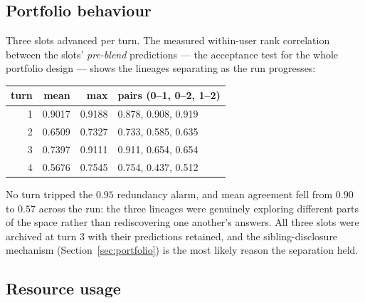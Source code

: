 \documentclass[11pt,a4paper]{article}
\begin{document}
\subsection{Portfolio behaviour}

Three slots advanced per turn. The measured within-user rank correlation between the slots'
\emph{pre-blend} predictions --- the acceptance test for the whole portfolio design --- shows
the lineages separating as the run progresses:

\begin{center}
\small
\begin{tabular}{@{}rrrl@{}}
\toprule
\textbf{turn} & \textbf{mean} & \textbf{max} & \textbf{pairs (0--1, 0--2, 1--2)} \\
\midrule
1 & 0.9017 & 0.9188 & 0.878, 0.908, 0.919 \\
2 & 0.6509 & 0.7327 & 0.733, 0.585, 0.635 \\
3 & 0.7397 & 0.9111 & 0.911, 0.654, 0.654 \\
4 & 0.5676 & 0.7545 & 0.754, 0.437, 0.512 \\
\bottomrule
\end{tabular}
\end{center}

\noindent
No turn tripped the $0.95$ redundancy alarm, and mean agreement fell from $0.90$ to $0.57$
across the run: the three lineages were genuinely exploring different parts of the space
rather than rediscovering one another's answers. All three slots were archived at turn 3 with
their predictions retained, and the sibling-disclosure mechanism (Section~\ref{sec:portfolio})
is the most likely reason the separation held.

\subsection{Resource usage}
\end{document}
